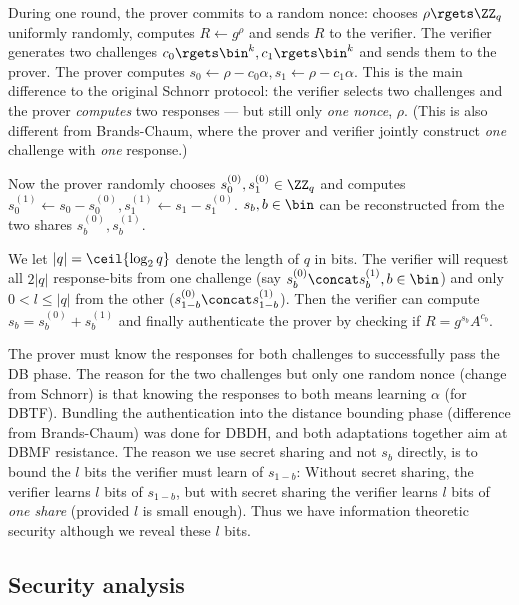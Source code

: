 During one round, the prover commits to a random nonce: \ie chooses 
\(\rho\rgets \ZZ_q\) uniformly randomly, computes \(R\gets g^\rho\) and sends 
\(R\) to the verifier.
The verifier generates two challenges \(c_0\rgets \bin^k, c_1\rgets \bin^k\) 
and sends them to the prover.
The prover computes \(s_0\gets \rho - c_0\alpha, s_1\gets \rho - c_1\alpha\).
This is the main difference to the original Schnorr protocol: the verifier 
selects two challenges and the prover \emph{computes} two responses --- but 
still only \emph{one nonce}, \(\rho\).
(This is also different from Brands-Chaum, where the prover and verifier 
jointly construct \emph{one} challenge with \emph{one} response.)

Now the prover randomly chooses
\(s_0^{(0)}, s_1^{(0)}\in \ZZ_q\)
and computes
\(s_0^{(1)} \gets s_0 - s_0^{(0)}, s_1^{(1)} \gets s_1 - s_1^{(0)}\).
\Ie \(s_b, b\in\bin\) can be reconstructed from the two shares \(s_b^{(0)}, 
  s_b^{(1)}\).

We let \(|q| = \ceil{\log_2 q}\) denote the length of \(q\) in bits.
The verifier will request all \(2|q|\) response-bits from one challenge (say 
\(s_b^{(0)}\concat s_b^{(1)}, b\in \bin\)) and only \(0 < l\leq |q|\) from the 
other (\(s_{1-b}^{(0)}\concat s_{1-b}^{(1)}\)).
Then the verifier can compute \(s_b = s_b^{(0)} + s_b^{(1)}\) and finally 
authenticate the prover by checking if \(R = g^{s_b}A^{c_b}\).

The prover must know the responses for both challenges to successfully pass the 
\ac{DB} phase.
The reason for the two challenges but only one random nonce (change from 
Schnorr) is that knowing the responses to both means learning \(\alpha\) (for
\ac{DBTF}).
Bundling the authentication into the distance bounding phase (difference from 
Brands-Chaum) was done for \ac{DBDH},
and both adaptations together aim at \ac{DBMF} resistance. %
The reason we use secret sharing and not \(s_b\) directly, is to bound the 
\(l\) bits the verifier must learn of \(s_{1-b}\):
Without secret sharing, the verifier learns \(l\) bits of \(s_{1-b}\), but with 
secret sharing the verifier learns \(l\) bits of \emph{one share} (provided 
\(l\) is small enough).
Thus we have information theoretic security although we reveal these \(l\) 
bits.

\subsection{Security analysis}

